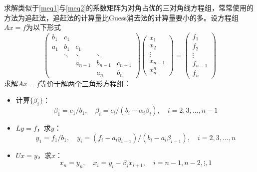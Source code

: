 \documentclass{ctexart} %
\begin{document}
求解类似于\eqref{meq1}与\eqref{meq2}的系数矩阵为对角占优的三对角线方程组，常常使用的方法为追赶法，追赶法的计算量比Guess消去法的计算量要小的多。设方程组$Ax=f$为以下形式
\begin{equation}
\left(
\begin{matrix}
b_1       & c_1   &  & &\\
a_1       & b_1   & c_1    & & \\
          & \ddots  & \ddots  &\ddots   & \\
          &        & a_{n-1}  &b_{n-1}  & c_{n-1}   \\
          &        &          &a_n      &b_n
\end{matrix}
\right)
\left(
\begin{matrix}
x_1\\
x_2\\
\vdots\\
x_{n-1}\\
x_n^{n}
\end{matrix}
\right)
=
\left(
\begin{matrix}
f_1\\
f_2\\
\vdots\\
f_{n-1}\\
f_n
\end{matrix}
\right)
\end{equation}
求解$Ax=f$等价于解两个三角形方程组：
\begin{itemize}
\item 计算$\{\beta_i\}$：
\begin{equation}
\beta_1=c_1/b_1,\quad \beta_i=c_i/(b_i-\alpha_i\beta_i),\quad i=2,3,\ldots,n-1
\end{equation}

\item $Ly=f$，求$y$：
\begin{equation}
y_1=f_1/b_1,\quad y_i=(f_i-a_iy_{i-1})/(b_i-a_i\beta_{i-1}),\quad i=2,3,\ldots,n
\end{equation}

\item $Ux=y$，求$x$：
\begin{equation}
x_n=y_n,\quad x_i=y_i-\beta_ix_{i+1},\quad i=n-1,n-2,\vdots,1
\end{equation}

\end{itemize}
\end{document}
